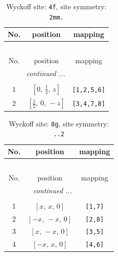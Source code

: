 \documentclass[fleqn,8pt]{jsarticle}
\begin{document}
\renewcommand{\arraystretch}{1.2}
\begin{longtable}{ccc}
\caption{Wyckoff site: {\tt 4f}, site symmetry: {\tt 2mm.}}
 \\
 \hline \hline
No. & position & mapping \\ \hline \endfirsthead

\multicolumn{2}{l}{\tablename\ \thetable{}} \\
 \hline \hline
No. & position & mapping \\ \hline \endhead

 \hline \hline
\multicolumn{2}{r}{\footnotesize\it continued ...} \\ \endfoot

 \hline \hline
\multicolumn{2}{r}{} \\ \endlastfoot

1 & $\left[ 0,\, \frac{1}{2},\, z \right]$ & {\tt [1,2,5,6]} \\ \hline
2 & $\left[ \frac{1}{2},\, 0,\, - z \right]$ & {\tt [3,4,7,8]} \\
\end{longtable}
\renewcommand{\arraystretch}{1.2}
\begin{longtable}{ccc}
\caption{Wyckoff site: {\tt 8g}, site symmetry: {\tt ..2}}
 \\
 \hline \hline
No. & position & mapping \\ \hline \endfirsthead

\multicolumn{2}{l}{\tablename\ \thetable{}} \\
 \hline \hline
No. & position & mapping \\ \hline \endhead

 \hline \hline
\multicolumn{2}{r}{\footnotesize\it continued ...} \\ \endfoot

 \hline \hline
\multicolumn{2}{r}{} \\ \endlastfoot

1 & $\left[ x,\, x,\, 0 \right]$ & {\tt [1,7]} \\ \hline
2 & $\left[ - x,\, - x,\, 0 \right]$ & {\tt [2,8]} \\ \hline
3 & $\left[ x,\, - x,\, 0 \right]$ & {\tt [3,5]} \\ \hline
4 & $\left[ - x,\, x,\, 0 \right]$ & {\tt [4,6]} \\
\end{longtable}
\renewcommand{\arraystretch}{1.2}
\end{document}

